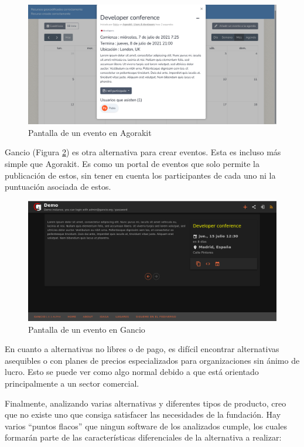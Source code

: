 \begin{figure}[h!]
    \centerline{\includegraphics[width=\textwidth]{imagenes/estado_arte/agora2.png}}
    \caption{Pantalla de un evento en Agorakit}
    \label{fig:agora2}
\end{figure}

Gancio (Figura \ref{fig:gancio}) es otra alternativa para crear eventos. Esta es incluso más simple que Agorakit. Es como un portal de eventos que solo permite la publicación de estos, sin tener en cuenta los participantes de cada uno ni la puntuación asociada de estos.

\begin{figure}[h!]
    \centerline{\includegraphics[width=\textwidth]{imagenes/estado_arte/gancio.png}}
    \caption{Pantalla de un evento en Gancio}
    \label{fig:gancio}
\end{figure}

En cuanto a alternativas no libres o de pago, es difícil encontrar alternativas asequibles o con planes de precios especializados para organizaciones sin ánimo de lucro. Esto se puede ver como algo normal debido a que está orientado principalmente a un sector comercial.

Finalmente, analizando varias alternativas y diferentes tipos de producto, creo que no existe uno que consiga satisfacer las necesidades de la fundación. Hay varios ``puntos flacos'' que ningun software de los analizados cumple, los cuales formarán parte de las características diferenciales de la alternativa a realizar:

